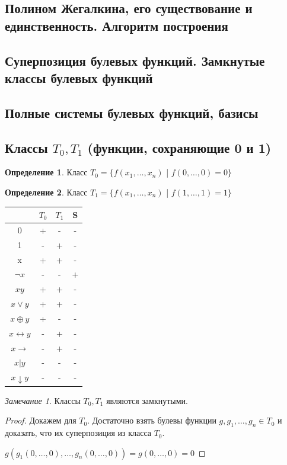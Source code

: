 \documentclass[a4paper]{article}
\theoremstyle{definition}
\newtheorem*{definition}{Определение}
\theoremstyle{remark}
\newtheorem*{remark}{Замечание}
\begin{document}
    \subsection{Полином Жегалкина, его существование и единственность. Алгоритм построения}
    \subsection{Суперпозиция булевых функций. Замкнутые классы булевых функций}
    \subsection{Полные системы булевых функций, базисы}
    \subsection{Классы $T_0, T_1$ (функции, сохраняющие 0 и 1)}
    \begin{definition}
        Класс $T_0 = \{f(x_1,\dots, x_n)$ | $f(0, \dots, 0) = 0\}$
    \end{definition}
    \begin{definition}
        Класс $T_1 = \{f(x_1,\dots, x_n)$ | $f(1, \dots, 1) = 1\}$
    \end{definition}
    \begin{tabular}{c|c|c|c}
        & $T_0$ & $T_1$ & S\\
        \hline
        0 & + & - & - \\
        1 & - & + & - \\
        x & + & + & - \\
        $\neg x$ & - & - & + \\
        $xy$ & + & + & - \\
        $x \vee y$ & + & + & -\\
        $x\oplus y$ & + & - & -\\
        $x\leftrightarrow y$ & - & + & -\\
        $x\rightarrow$ & - & + & -\\
        $x|y$ & - & - & -\\
        $x\downarrow y$ & - & - & -\\
    \end{tabular}
    \begin{remark}
        Классы $T_0, T_1$ являются замкнутыми.
    \end{remark}
    \begin{proof}
        Докажем для $T_0$. Достаточно взять булевы функции $g, g_1, \dots, g_n\in T_0$
        и доказать, что их суперпозиция из класса $T_0.$

        $g(g_1 (0, \dots, 0), \dots, g_n(0, \dots, 0)) = g(0, \dots, 0) = 0$
    \end{proof}
\end{document}
